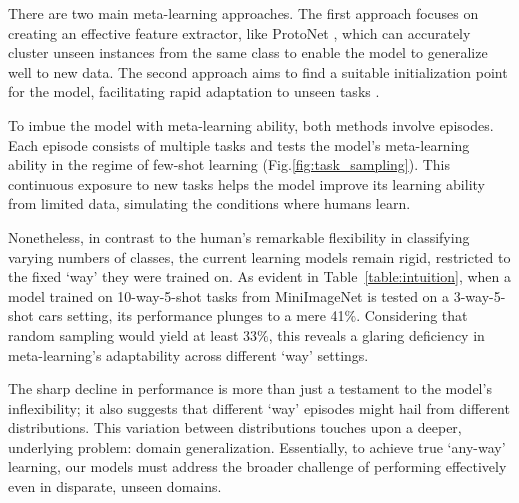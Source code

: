 \documentclass[letterpaper]{article} %
\begin{document}
There are two main meta-learning approaches. The first approach focuses on creating an effective feature extractor, like ProtoNet \cite{episodic:MBML:Protonet}, which can accurately cluster unseen instances from the same class to enable the model to generalize well to new data. The second approach aims to find a suitable initialization point for the model, facilitating rapid adaptation to unseen tasks \cite{episodic:GBML:MAML, episodic:GBML:LEO}. 

To imbue the model with meta-learning ability, both methods involve episodes. Each episode consists of multiple tasks and tests the model's meta-learning ability in the regime of few-shot learning
(Fig.\ref{fig:task_sampling}). This continuous exposure to new tasks helps the model improve its learning ability from limited data, simulating the conditions where humans learn.

Nonetheless, in contrast to the human's remarkable flexibility in classifying varying numbers of classes, the current learning models remain rigid, restricted to the fixed `way' they were trained on. As evident in Table~\ref{table:intuition}, when a model trained on 10-way-5-shot tasks from MiniImageNet \cite{dataset:MiniImageNet} is tested on a 3-way-5-shot cars \cite{dataset:cars} setting, its performance plunges to a mere 41$\%$. Considering that random sampling would yield at least 33$\%$, this reveals a glaring deficiency in meta-learning's adaptability across different `way' settings.

The sharp decline in performance is more than just a testament to the model's inflexibility; it also suggests that different `way' episodes might hail from different distributions. This variation between distributions touches upon a deeper, underlying problem: domain generalization. Essentially, to achieve true `any-way' learning, our models must address the broader challenge of performing effectively even in disparate, unseen domains.
\end{document}
